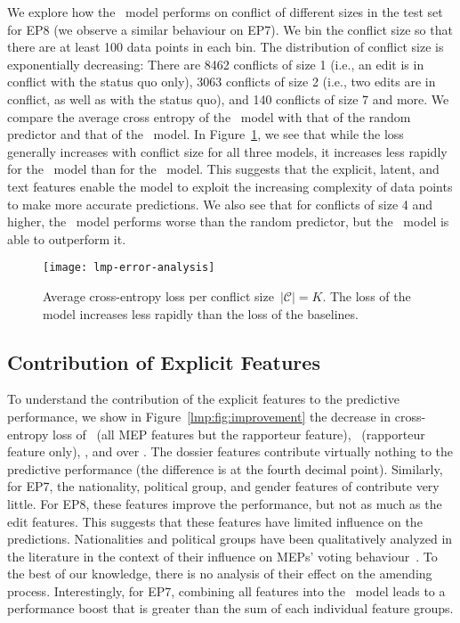 We explore how the \ model performs on conflict of different sizes in the test set for EP8 (we observe a similar behaviour on EP7).
We bin the conflict size so that there are at least 100 data points in each bin.
The distribution of conflict size is exponentially decreasing: There are 8462 conflicts of size 1 (i.e., an edit is in conflict with the status quo only), 3063 conflicts of size 2 (i.e., two edits are in conflict, as well as with the status quo), and 140 conflicts of size 7 and more.
We compare the average cross entropy of the \ model with that of the random predictor and that of the \wow{}\ model.
In Figure~\ref{lmp:fig:error-analysis}, we see that while the loss generally increases with conflict size for all three models, it increases less rapidly for the \ model than for the \wow{}\ model.
This suggests that the explicit, latent, and text features enable the model to exploit the increasing complexity of data points to make more accurate predictions.
We also see that for conflicts of size 4 and higher, the \wow{}\ model performs worse than the random predictor, but the \ model is able to outperform it.

\begin{figure}
	\centering
	\texttt{[image: lmp-error-analysis]}
	\caption{%
		Average cross-entropy loss per conflict size~$\vert \mathcal{C} \vert = K$.
		The loss of the  model increases less rapidly than the loss of the baselines.
	}
	\label{lmp:fig:error-analysis}
\end{figure}

\subsection{Contribution of Explicit Features}

To understand the contribution of the explicit features to the predictive performance, we show in Figure~\ref{lmp:fig:improvement} the decrease in cross-entropy loss of \ (all MEP features but the rapporteur feature), \ (rapporteur feature only), , and  over \wow{}.
The dossier features contribute virtually nothing to the predictive performance (the difference is at the fourth decimal point).
Similarly, for EP7, the nationality, political group, and gender features of  contribute very little.
For EP8, these features improve the performance, but not as much as the edit features.
This suggests that these features have limited influence on the predictions.
Nationalities and political groups have been qualitatively analyzed in the literature in the context of their influence on MEPs' voting behaviour~\cite{hix2002parliamentary,coman2009reassessing,muhlbock2012national,lefkofridi2014multilevel}.
To the best of our knowledge, there is no analysis of their effect on the amending process.
Interestingly, for EP7, combining all features into the \ model leads to a performance boost that is greater than the sum of each individual feature groups.

